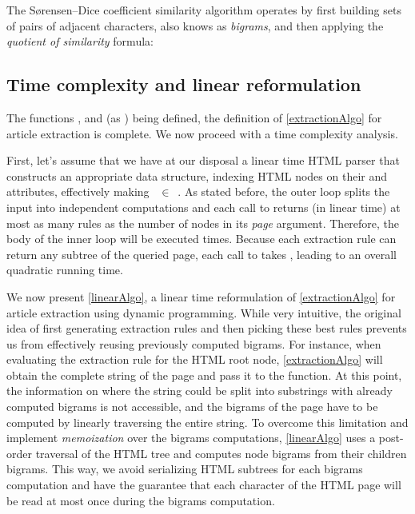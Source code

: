 \similarityTable

The Sørensen–Dice coefficient similarity algorithm operates by first building sets of pairs of adjacent characters, also knows as \emph{bigrams}, and then applying the \emph{quotient of similarity} formula:

\similarityAlgo


\subsection{Time complexity and linear reformulation}
\label{timecomplexityandlinearreformulation}

The functions ,  and  (as ) being defined, the definition of \autoref{extractionAlgo} for article extraction is complete. We now proceed with a time complexity analysis.

First, let's assume that we have at our disposal a linear time HTML parser that constructs an appropriate data structure, indexing HTML nodes on their  and  attributes, effectively making ~$\in$~. As stated before, the outer loop splits the input into independent computations and each call to  returns (in linear time) at most as many rules as the number of nodes in its \emph{page} argument. Therefore, the body of the inner loop will be executed  times. Because each extraction rule can return any subtree of the queried page, each call to  takes , leading to an overall quadratic running time.

We now present \autoref{linearAlgo}, a linear time reformulation of \autoref{extractionAlgo} for article extraction using dynamic programming. While very intuitive, the original idea of first generating extraction rules and then picking these best rules prevents us from effectively reusing previously computed bigrams. For instance, when evaluating the extraction rule for the HTML root node, \autoref{extractionAlgo} will obtain the complete string of the page and pass it to the  function. At this point, the information on where the string could be split into substrings with already computed bigrams is not accessible, and the bigrams of the page have to be computed by linearly traversing the entire string. To overcome this limitation and implement \emph{memoization} over the bigrams computations, \autoref{linearAlgo} uses a post-order traversal of the HTML tree and computes node bigrams from their children bigrams. This way, we avoid serializing HTML subtrees for each bigrams computation and have the guarantee that each character of the HTML page will be read at most once during the bigrams computation.

